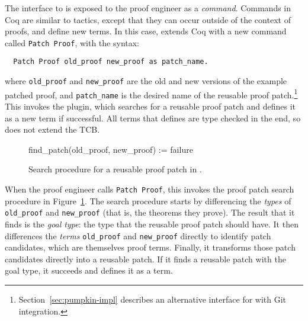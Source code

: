 The interface to \sysname is exposed to the proof engineer as a \textit{command}. %
Commands in Coq are similar to tactics, except that they can occur outside of the context of proofs, and define new terms.
In this case, \sysname extends Coq with a new command called \lstinline{Patch Proof}, with the syntax:

\begin{lstlisting}
  Patch Proof old_proof new_proof as patch_name. 
\end{lstlisting}
where \lstinline{old_proof} and \lstinline{new_proof} are the old and new versions of the example patched proof,
and \lstinline{patch_name} is the desired name of the reusable proof patch.\footnote{Section~\ref{sec:pumpkin-impl} describes an alternative interface for \sysname with Git integration.}
This invokes the \sysname plugin, which searches for a reusable proof patch
and defines it as a new term if successful.
All terms that \sysname defines are type checked in the end, so \sysname does not extend the TCB. %

\begin{figure}
\begin{algorithmic}
\renewcommand{\thealgorithm}{}
\footnotesize
\STATE \hspace{-0.5cm} \footnotesize{find\_patch(old\_proof, new\_proof) :=}
    \STATE {}
    \STATE {}
      \STATE {}
    \ENDIF
    \RETURN failure
\end{algorithmic}
\caption{Search procedure for a reusable proof patch in \sysname.}
\label{alg:patching}	
\end{figure}

When the proof engineer calls \lstinline{Patch Proof}, this invokes the proof patch search procedure in Figure~\ref{alg:patching}.
The search procedure starts by differencing the \textit{types} of \lstinline{old_proof} and \lstinline{new_proof}
(that is, the theorems they prove).
The result that it finds is the \textit{goal type}: the type that the reusable proof patch should have.
It then differences the \textit{terms} \lstinline{old_proof} and \lstinline{new_proof} directly to identify patch candidates,
which are themselves proof terms.
Finally, it transforms those patch candidates directly into a reusable patch.
If it finds a reusable patch with the goal type, it succeeds and defines it as a term.


